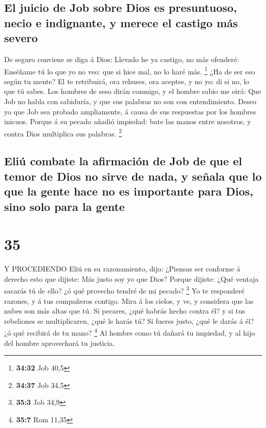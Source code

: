 \hypertarget{el-juicio-de-job-sobre-dios-es-presuntuoso-necio-e-indignante-y-merece-el-castigo-muxe1s-severo}{%
\subsection{El juicio de Job sobre Dios es presuntuoso, necio e
indignante, y merece el castigo más
severo}\label{el-juicio-de-job-sobre-dios-es-presuntuoso-necio-e-indignante-y-merece-el-castigo-muxe1s-severo}}

 De seguro conviene se diga á Dios: Llevado he ya castigo,
no más ofenderé:  Enséñame tú lo que yo no veo: que si hice
mal, no lo haré más. \footnote{\textbf{34:32} Job 40,5} 
¿Ha de ser eso según tu mente? El te retribuirá, ora rehuses, ora
aceptes, y no yo: di si no, lo que tú sabes.  Los hombres
de seso dirán conmigo, y el hombre sabio me oirá:  Que Job
no habla con sabiduría, y que sus palabras no son con entendimiento.
 Deseo yo que Job sea probado ampliamente, á causa de sus
respuestas por los hombres inicuos.  Porque á su pecado
añadió impiedad: bate las manos entre nosotros, y contra Dios multiplica
sus palabras. \footnote{\textbf{34:37} Job 34,5}

\hypertarget{eliuxfa-combate-la-afirmaciuxf3n-de-job-de-que-el-temor-de-dios-no-sirve-de-nada-y-seuxf1ala-que-lo-que-la-gente-hace-no-es-importante-para-dios-sino-solo-para-la-gente}{%
\subsection{Eliú combate la afirmación de Job de que el temor de Dios no
sirve de nada, y señala que lo que la gente hace no es importante para
Dios, sino solo para la
gente}\label{eliuxfa-combate-la-afirmaciuxf3n-de-job-de-que-el-temor-de-dios-no-sirve-de-nada-y-seuxf1ala-que-lo-que-la-gente-hace-no-es-importante-para-dios-sino-solo-para-la-gente}}

\hypertarget{section-34}{%
\section{35}\label{section-34}}

 Y PROCEDIENDO Eliú en su razonamiento, dijo: 
¿Piensas ser conforme á derecho esto que dijiste: Más justo soy yo que
Dios?  Porque dijiste: ¿Qué ventaja sacarás tú de ello? ¿ó
qué provecho tendré de mi pecado? \footnote{\textbf{35:3} Job 34,9}
 Yo te responderé razones, y á tus compañeros contigo.
 Mira á los cielos, y ve, y considera que las nubes son más
altas que tú.  Si pecares, ¿qué habrás hecho contra él? y si
tus rebeliones se multiplicaren, ¿qué le harás tú?  Si
fueres justo, ¿qué le darás á él? ¿ó qué recibirá de tu mano?
\footnote{\textbf{35:7} Rom 11,35}  Al hombre como tú dañará
tu impiedad, y al hijo del hombre aprovechará tu justicia.

